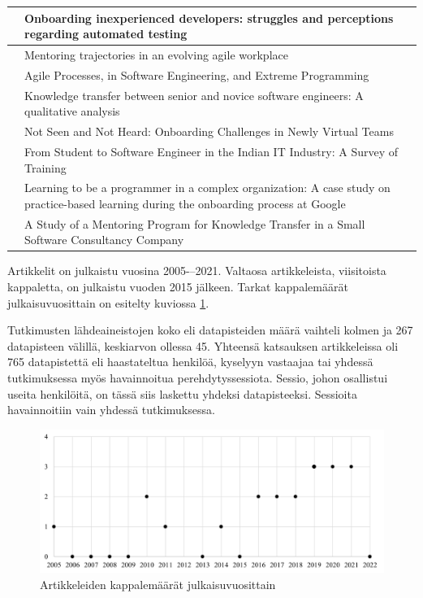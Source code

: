 \documentclass[utf8]{gradu3}
\begin{document}
\begin{footnotesize}
\begin{longtable}{ m{4cm}  m{10.5cm} }
\hline
\textcite{pham-ym-2017} & Onboarding inexperienced developers: struggles and perceptions regarding automated testing \\
\hline
\textcite{kumar-ym-2016} & Mentoring trajectories in an evolving agile workplace \\
\hline
\textcite{shannon-pool-2016} & Agile Processes, in Software Engineering, and Extreme Programming \\
\hline
\textcite{viana-ym-2014} & Knowledge transfer between senior and novice software engineers: A qualitative analysis \\
\hline
\textcite{hemphill-begel-2011} & Not Seen and Not Heard: Onboarding Challenges in Newly Virtual Teams \\
\hline
\textcite{kulkarni-ym-2010} & From Student to Software Engineer in the Indian IT Industry: A Survey of Training \\
\hline
 \textcite{johnson-senges-2010} & Learning to be a programmer in a complex organization: A case study on practice-based learning during the onboarding process at Google\\
\hline
\textcite{bjornson-dingsøyr-2005} & A Study of a Mentoring Program for Knowledge Transfer in a Small Software Consultancy Company \\

\hline
\end{longtable}
\end{footnotesize}

Artikkelit on julkaistu vuosina 2005-–2021. Valtaosa artikkeleista, viisitoista kappaletta, on julkaistu vuoden 2015 jälkeen. Tarkat kappalemäärät julkaisuvuosittain on esitelty kuviossa \ref{kuvio:kappalemaarat-julkaisuvuosittain-tiivis}.

Tutkimusten lähdeaineistojen koko eli datapisteiden määrä vaihteli kolmen \parencite{kulkarni-ym-2010} ja 267 datapisteen \parencite{rodeghero-ym-2021} välillä, keskiarvon ollessa 45. Yhteensä katsauksen artikkeleissa oli 765 datapistettä eli haastateltua henkilöä, kyselyyn vastaajaa tai yhdessä tutkimuksessa myös havainnoitua perehdytyssessiota. Sessio, johon osallistui useita henkilöitä, on tässä siis laskettu yhdeksi datapisteeksi. Sessioita havainnoitiin vain yhdessä tutkimuksessa.

\begin{figure}[h]
    \centering
    \includegraphics[width=\textwidth]{media/kappalemaarat-julkaisuvuosittain-tiivis.png}
    \caption{Artikkeleiden kappalemäärät julkaisuvuosittain}
    \label{kuvio:kappalemaarat-julkaisuvuosittain-tiivis}
\end{figure}
\end{document}
